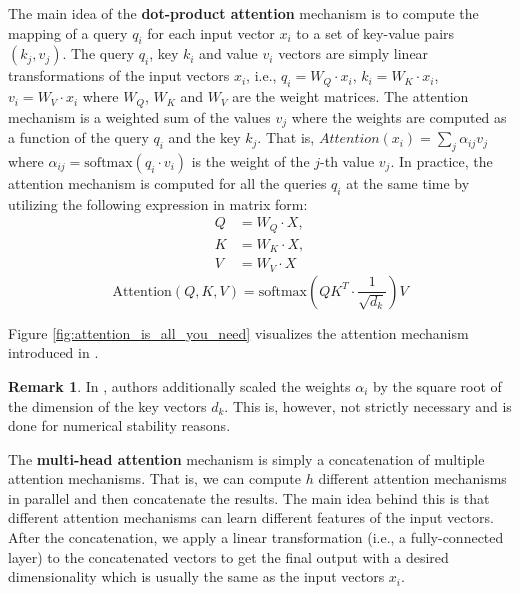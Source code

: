 \documentclass[a4paper, twoside]{report}
\theoremstyle{definition}
\newtheorem{remark}[theorem]{Remark}
\numberwithin{equation}{section}
\begin{document}
The main idea of the \textbf{dot-product attention} mechanism is to compute the mapping of a query $q_i$ for each input vector $x_i$ to a set of key-value pairs $(k_j, v_j)$.
The query $q_i$, key $k_i$ and value $v_i$ vectors are simply linear transformations of the input vectors $x_i$,
i.e., $q_i=W_Q\cdot x_i$, $k_i=W_K\cdot x_i$, $v_i=W_V\cdot x_i$ where $W_Q$, $W_K$ and $W_V$ are the weight matrices.
The attention mechanism is a weighted sum of the values $v_j$ where the weights are computed as a function of the query $q_i$ and the key $k_j$.
That is, $Attention(x_i)=\sum_j \alpha_{ij} v_j$ where $\alpha_{ij}=\text{softmax}(q_i \cdot v_i)$ is the weight of the $j$-th value $v_j$.
In practice, the attention mechanism is computed for all the queries $q_i$ at the same time by utilizing the following expression in matrix form:
\begin{equation}
    \begin{array}{rll}
        Q & = W_Q \cdot X, \\
        K & = W_K \cdot X, \\
        V & = W_V \cdot X
    \end{array}
\end{equation}
\begin{equation}\label{eq:dot_product_attention_matrix}
    \text{Attention}(Q, K, V)=\text{softmax}(Q K^T \cdot \frac{1}{\sqrt{d_k}}) V
\end{equation}

Figure \ref{fig:attention_is_all_you_need} visualizes the attention mechanism introduced in \cite{1706.03762}.

\begin{remark}
    In \cite{1706.03762}, authors additionally scaled the weights $\alpha_i$ by the square root of the dimension of the key vectors $d_k$.
    This is, however, not strictly necessary and is done for numerical stability reasons.
\end{remark}

The \textbf{multi-head attention} mechanism is simply a concatenation of multiple attention mechanisms.
That is, we can compute $h$ different attention mechanisms in parallel and then concatenate the results.
The main idea behind this is that different attention mechanisms can learn different features of the input vectors.
After the concatenation, we apply a linear transformation (i.e., a fully-connected layer) to the concatenated vectors to get the final output
with a desired dimensionality which is usually the same as the input vectors $x_i$.
\end{document}

